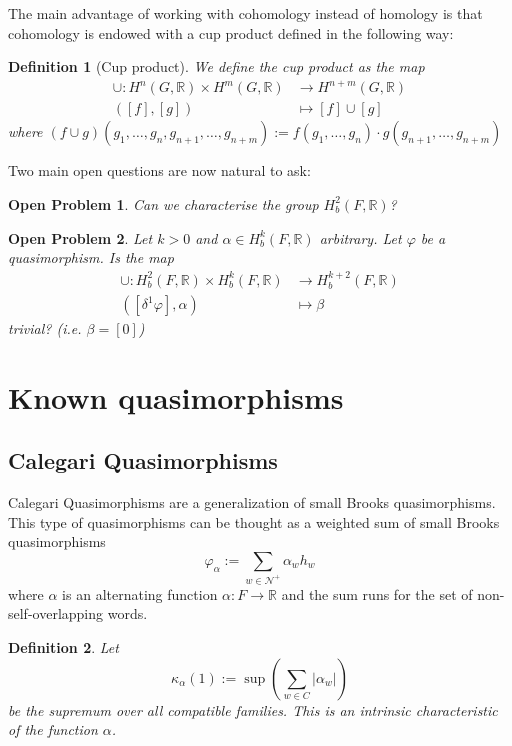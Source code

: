 \documentclass[leqno]{article}
\newtheorem*{definition}{Definition}
\newtheorem*{openproblem}{Open Problem}
\begin{document}
The main advantage of working with cohomology instead of homology is that cohomology is endowed with a cup product defined in the following way:

 \begin{definition}[Cup product] We define the cup product as the map
\begin{align*}
  \cup : H^n(G, \mathbb{R}) \times H^m(G, \mathbb{R}) &\to H^{n+m}(G, \mathbb{R}) \\
  ([f], [g]) & \mapsto [f]\cup [g] 
\end{align*} 
where $(f\cup g)(g_1, \ldots, g_n, g_{n+1}, \ldots, g_{n+m}) := f(g_1, \ldots, g_n)\cdot g(g_{n+1}, \ldots, g_{n+m})$
\end{definition}

Two main open questions are now natural to ask:

\begin{openproblem} Can we characterise the group $H^2_b(F, \mathbb{R})$?
\end{openproblem}

\begin{openproblem} Let  $k>0$ and  $\alpha \in H^k_b(F, \mathbb{R})$ arbitrary. Let $\varphi $ be a quasimorphism. Is  the map
  \begin{align*}
	\cup : H^2_b(F, \mathbb{R}) \times H_b^k(F, \mathbb{R}) &\to H^{k+2}_b(F, \mathbb{R}) \\
	([\delta^1\varphi], \alpha ) &\mapsto \beta 
  \end{align*}
  trivial? (i.e. $\beta =[0]$)
\end{openproblem}

\section{Known quasimorphisms} 

\subsection{Calegari Quasimorphisms}
Calegari Quasimorphisms are a generalization of small Brooks quasimorphisms. This type of quasimorphisms can be thought as a weighted sum of small Brooks quasimorphisms
\[
\varphi _\alpha := \sum_{w\in \mathcal{N}^+} \alpha _w h_w
\] 
where $\alpha $ is an alternating function $\alpha :F\to \mathbb{R}$ and the sum runs for the set of non-self-overlapping words.

\begin{definition} Let
  \[
  \kappa_\alpha (1):= \sup \left( \sum_{w\in C} |\alpha _w| \right) 
  \] 
  be the supremum over all compatible families. This is an intrinsic characteristic of the function $\alpha$.
\end{definition}
\end{document}

